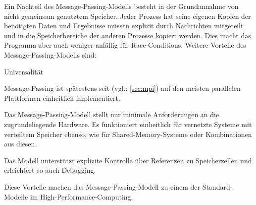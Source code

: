       Ein Nachteil des Message-Passing-Modells besteht in der Grundannahme von nicht gemeinsam genutztem Speicher.
      Jeder Prozess hat seine eigenen Kopien der benötigten Daten und Ergebnisse müssen explizit durch Nachrichten mitgeteilt und in die Speicherbereiche der anderen Prozesse kopiert werden. Dies
      macht das Programm aber auch weniger anfällig für Race-Conditions. Weitere Vorteile des Message-Passing-Modells sind:
      \begin{labeling}{Universalität }
	\item[Portabilität] Message-Passing ist spätestens seit  (vgl.: \autoref{sec:mpi}) auf den meisten parallelen Plattformen einheitlich implementiert.
	\item[Universalität] Das Message-Passing-Modell stellt nur minimale Anforderungen an die zugrundeliegende Hardware. Es funktioniert einheitlich für vernetzte Systeme mit verteiltem 
			     Speicher ebenso, wie für Shared-Memory-Systeme oder Kombinationen aus diesen.
	\item[Einfachheit] Das Modell unterstützt explizite Kontrolle über Referenzen zu Speicherzellen und erleichtert so auch Debugging.
      \end{labeling}
      Diese Vorteile machen das Message-Passing-Modell zu einem der Standard-Modelle im High-Performance-Computing.\citep{ibm_mpm, anl_mpm, fsu_mpm}
    